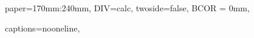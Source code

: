 
\ifxetexorluatex
  \setmainfont{Minion Pro}
\else
  \usepackage[lf]{ebgaramond}
  \usepackage[oldstyle,scale=0.7]{sourcecodepro}
  \singlespacing
\fi

\renewcommand{\th}{\textsuperscript{\textup{th}}\xspace}

\KOMAoptions
  {
    paper=170mm:240mm,  %
    DIV=calc,           %
    twoside=false,      %
    BCOR = 0mm,         %
  }
\recalctypearea %



\KOMAoptions
  {
    captions=nooneline,            %
  }
\setcapindent{0.5em}               %

